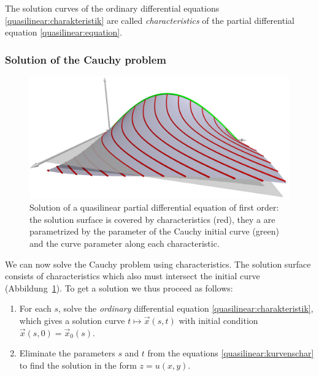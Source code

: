 \begin{definition}
\label{def:quasiliniear:charakteristik}
The solution curves of the ordinary differential equations
\eqref{quasilinear:charakteristik} are called {\em characteristics}
of the partial differential equation \eqref{quasilinear:equation}.
\end{definition}

\subsubsection{Solution of the Cauchy problem}
\begin{figure}
\begin{center}
\includegraphics[width=\hsize]{../common/3d/sol.jpg}
\end{center}
\caption{Solution of a quasilinear partial differential equation
of first order: the solution surface is covered by characteristics (red),
they a are parametrized by the parameter of the Cauchy initial curve
(green) and the curve parameter along each characteristic.
\label{geometrie:loesung-mit-charakteristiken}}
\end{figure}
We can now solve the Cauchy problem using characteristics.
The solution surface consists of characteristics which also must
intersect the initial curve
(Abbildung~\ref{geometrie:loesung-mit-charakteristiken}).
To get a solution we thus proceed as follows:
\begin{enumerate}
\item
For each $s$, solve the {\em ordinary} differential equation
\eqref{quasilinear:charakteristik}, which gives a solution curve
$t\mapsto \vec x(s,t)$ with initial condition
$\vec x(s,0)=\vec x_0(s)$.
\item 
Eliminate the parameters $s$ and $t$ from the equations
\eqref{quasilinear:kurvenschar} to find the solution in the form
$z=u(x,y)$.
\end{enumerate}

